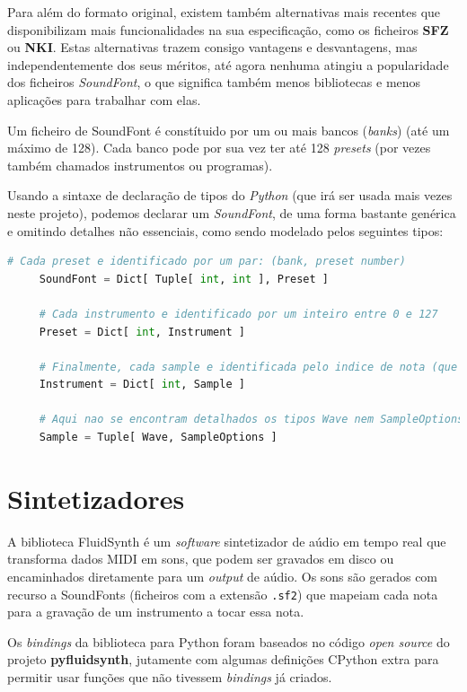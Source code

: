 \documentclass[
  oneside,
  11pt, a4paper,
  footinclude=true,
  headinclude=true,
  cleardoublepage=empty
]{scrbook}
\begin{document}
    Para além do formato original, existem também alternativas mais recentes que disponibilizam mais funcionalidades na sua especificação, como os ficheiros \textbf{SFZ} ou \textbf{NKI}. Estas alternativas trazem consigo vantagens e desvantagens, mas independentemente dos seus méritos, até agora nenhuma atingiu a popularidade dos ficheiros \textit{SoundFont}, o que significa também menos bibliotecas e menos aplicações para trabalhar com elas.

    Um ficheiro de SoundFont é constítuido por um ou mais bancos (\textit{banks}) (até um máximo de 128). Cada banco pode por sua vez ter até 128 \textit{presets} (por vezes também chamados instrumentos ou programas).

    Usando a sintaxe de declaração de tipos do \textit{Python} (que irá ser usada mais vezes neste projeto), podemos declarar um \textit{SoundFont}, de uma forma bastante genérica e omitindo detalhes não essenciais, como sendo modelado pelos seguintes tipos:
    \newpage
    \begin{lstlisting}[caption=Sistema de Tipos de um ficheiro SoundFont,language=Python]
     # Cada preset e identificado por um par: (bank, preset number)
     SoundFont = Dict[ Tuple[ int, int ], Preset ]
     
     # Cada instrumento e identificado por um inteiro entre 0 e 127
     Preset = Dict[ int, Instrument ]
     
     # Finalmente, cada sample e identificada pelo indice de nota (que iremos abordar mais a frente em detalhe, no capitulo sobre sintetizadores)
     Instrument = Dict[ int, Sample ]
     
     # Aqui nao se encontram detalhados os tipos Wave nem SampleOptions.
     Sample = Tuple[ Wave, SampleOptions ]
    \end{lstlisting}


	\section{Sintetizadores}
	A biblioteca FluidSynth é um \textit{software} sintetizador de aúdio em tempo real que transforma dados MIDI em sons, que podem ser gravados em disco ou encaminhados diretamente para um \textit{output} de aúdio. Os sons são gerados com recurso a SoundFonts\cite{soundfont} (ficheiros com a extensão \texttt{.sf2}) que mapeiam cada nota para a gravação de um instrumento a tocar essa nota.

Os \textit{bindings} da biblioteca para Python foram baseados no código \textit{open source} do projeto \textbf{pyfluidsynth}\cite{pyfluidsynth}, jutamente com algumas definições CPython extra para permitir usar funções que não tivessem \textit{bindings} já criados.
\end{document}
